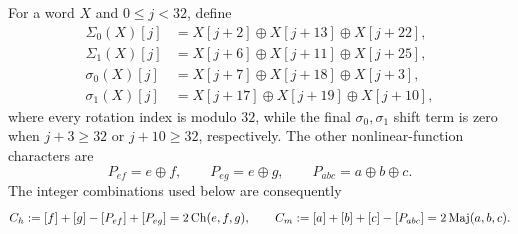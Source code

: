 For a word $X$ and $0\le j<32$, define
\begin{equation}
 \begin{aligned}
 \Sigma_0(X)[j]&=X[j+2]\oplus X[j+13]\oplus X[j+22],\\
 \Sigma_1(X)[j]&=X[j+6]\oplus X[j+11]\oplus X[j+25],\\
 \sigma_0(X)[j]&=X[j+7]\oplus X[j+18]\oplus X[j+3],\\
 \sigma_1(X)[j]&=X[j+17]\oplus X[j+19]\oplus X[j+10],
 \end{aligned}
 \label{eq:sha-m-rotations}
\end{equation}
where every rotation index is modulo $32$, while the final
$\sigma_0,\sigma_1$ shift term is zero when
$j+3\ge32$ or $j+10\ge32$, respectively.  The other nonlinear-function
characters are
\begin{equation}
 P_{ef}=e\oplus f,\qquad P_{eg}=e\oplus g,\qquad
 P_{abc}=a\oplus b\oplus c.
 \label{eq:sha-m-parities}
\end{equation}
The integer combinations used below are consequently
\begin{equation}
 C_h:=[f]+[g]-[P_{ef}]+[P_{eg}]=2\operatorname{Ch}(e,f,g),\qquad
 C_m:=[a]+[b]+[c]-[P_{abc}]=2\operatorname{Maj}(a,b,c).
 \label{eq:sha-chmaj}
\end{equation}

